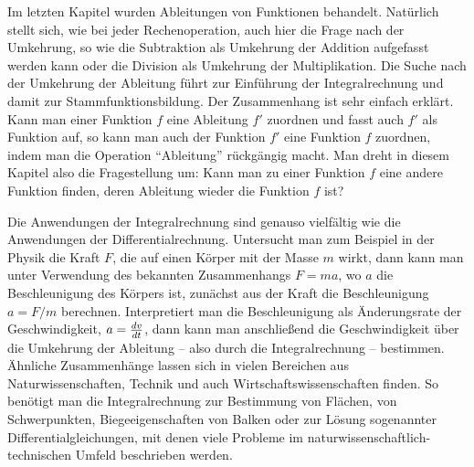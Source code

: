 
\Mtikzexternalize
{}



\begin{MSectionStart}

\MModstartBox
\end{MSectionStart}


\begin{MIntro}
Im letzten Kapitel wurden Ableitungen von Funktionen behandelt. Natürlich 
stellt sich, wie bei jeder Rechenoperation, auch hier die Frage nach der 
Umkehrung, so wie die Subtraktion als Umkehrung der Addition aufgefasst werden 
kann oder die Division als Umkehrung der Multiplikation. Die Suche nach der
Umkehrung der Ableitung führt zur Einführung der Integralrechnung und damit zur 
Stammfunktionsbildung. Der Zusammenhang ist sehr einfach erklärt. Kann man 
einer Funktion $f$ eine Ableitung $f'$ zuordnen und fasst auch $f'$ als Funktion 
auf, so kann man auch der Funktion $f'$ eine Funktion $f$ zuordnen, indem man 
die Operation "`Ableitung"' rückgängig macht.
Man dreht in diesem Kapitel also die Fragestellung um: Kann man zu einer 
Funktion $f$ eine andere Funktion finden, deren Ableitung wieder die 
Funktion $f$ ist?

Die Anwendungen der Integralrechnung sind genauso vielfältig wie die 
Anwendungen der Differentialrechnung. Untersucht man zum Beispiel 
in der Physik die 
Kraft $F$, die auf einen Körper mit der Masse $m$ wirkt, dann kann man unter 
Verwendung des bekannten Zusammenhangs $F = m a$, wo $a$ die Beschleunigung 
des Körpers ist, zunächst aus der Kraft die Beschleunigung $a = F/m$ berechnen. 
Interpretiert man die Beschleunigung als Änderungsrate der Geschwindigkeit, 
$a = \frac{d v}{d t}$, dann kann man anschließend die Geschwindigkeit 
über die Umkehrung der Ableitung -- also durch die Integralrechnung -- bestimmen.
Ähnliche Zusammenhänge lassen sich in vielen Bereichen aus Naturwissenschaften, 
Technik und auch Wirtschaftswissenschaften finden. So benötigt man die 
Integralrechnung zur Bestimmung von Flächen, von Schwerpunkten, 
Biegeeigenschaften von Balken oder zur Lösung sogenannter 
Differentialgleichungen, mit denen viele Probleme im 
naturwissenschaftlich-technischen Umfeld beschrieben werden.
\end{MIntro}

